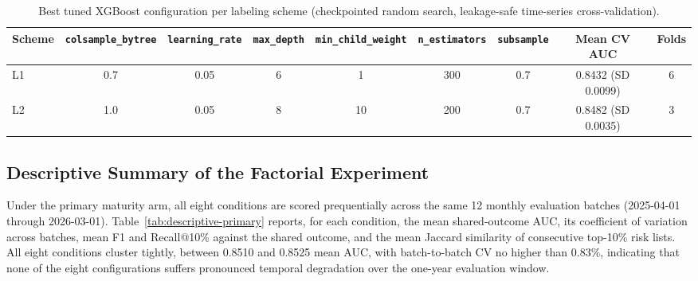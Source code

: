 \begin{table}[htbp]
  \centering
  \footnotesize
  \begin{tabular}{l c c c c c c c c}
    \toprule
    Scheme & \texttt{colsample\_bytree} & \texttt{learning\_rate} & \texttt{max\_depth} & \texttt{min\_child\_weight} & \texttt{n\_estimators} & \texttt{subsample} & Mean CV AUC & Folds \\
    \midrule
    L1 & 0.7 & 0.05 & 6 & 1 & 300 & 0.7 & 0.8432 (SD 0.0099) & 6 \\
    L2 & 1.0 & 0.05 & 8 & 10 & 200 & 0.7 & 0.8482 (SD 0.0035) & 3 \\
    \bottomrule
  \end{tabular}
  \caption{Best tuned XGBoost configuration per labeling scheme (checkpointed random search, leakage-safe time-series cross-validation).}
  \label{tab:tuning}
\end{table}

\subsection{Descriptive Summary of the Factorial Experiment}
\label{sec:truncation-artifact}

Under the primary maturity arm, all eight conditions are scored prequentially across the same 12 monthly evaluation batches (2025-04-01 through 2026-03-01). Table~\ref{tab:descriptive-primary} reports, for each condition, the mean shared-outcome AUC, its coefficient of variation across batches, mean F1 and Recall@10\% against the shared outcome, and the mean Jaccard similarity of consecutive top-10\% risk lists. All eight conditions cluster tightly, between 0.8510 and 0.8525 mean AUC, with batch-to-batch CV no higher than 0.83\%, indicating that none of the eight configurations suffers pronounced temporal degradation over the one-year evaluation window.

